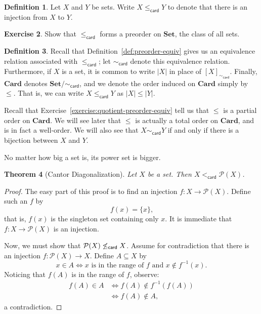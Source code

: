 \documentclass[letterpaper]{article}
\newtheorem{theorem}{Theorem}[section]
\theoremstyle{definition}
\newtheorem{definition}[theorem]{Definition}
\newtheorem{exercise}[theorem]{Exercise}
\renewcommand{\subset}{\subseteq}
\newcommand{\powerset}{\mathcal{P}}
\newcommand{\inverse}[1]{{#1^{-1}}}
\newcommand{\leqcard}{\mathrel{\leq_\mathsf{card}}}
\newcommand{\ltcard}{\mathrel{<_\mathsf{card}}}
\newcommand{\simcard}{\mathrel{\sim_\mathsf{card}}}
\newcommand{\setclass}{\mathbf{Set}}
\newcommand{\cardclass}{\mathbf{Card}}
\begin{document}
\begin{definition}
  Let \(X\) and \(Y\) be sets.  Write \(X \leqcard Y\) to denote that
  there is an injection from \(X\) to \(Y\).
\end{definition}

\begin{exercise}
  Show that \(\leqcard\) forms a preorder on \(\setclass\), the class
  of all sets.
\end{exercise}

\begin{definition}
  Recall that Definition~\ref{def:preorder-equiv} gives us an
  equivalence relation associated with \(\leqcard\); let \(\simcard\)
  denote this equivalence relation.  Furthermore, if \(X\) is a set,
  it is common to write \(|X|\) in place of \([X]_{\simcard}\).
  Finally, \(\cardclass\) denotes \(\setclass/{\simcard}\), and we
  denote the order induced on \(\cardclass\) simply by \(\leq\).  That
  is, we can write \(X \leqcard Y\) as \(|X| \leq |Y|\).
\end{definition}

Recall that Exercise~\ref{exercise:quotient-preorder-equiv} tell us
that \(\leq\) is a partial order on \(\cardclass\).  We will see later
that \(\leq\) is actually a total order on \(\cardclass\), and is in
fact a well-order.  We will also see that \(X \simcard Y\) if and only
if there is a bijection between \(X\) and \(Y\).

No matter how big a set is, its power set is bigger.
\begin{theorem}[Cantor Diagonalization]
  Let \(X\) be a set.  Then \(X \ltcard \powerset(X)\).
\end{theorem}
\begin{proof}
  The easy part of this proof is to find an injection \(f:X \to
  \powerset(X)\).  Define such an \(f\) by
  \[f(x) = \{x\}\text{,}\]
  that is, \(f(x)\) is the singleton set containing only \(x\).  It is
  immediate that \(f:X \to \powerset(X)\) is an injection.

  Now, we must show that \(\powerset(X) \not\leqcard X\).  Assume for
  contradiction that there is an injection \(f:\powerset(X) \to X\).
  Define \(A \subset X\) by
  \[x \in A \iff x \text{ is in the range of } f \text{ and } x \notin \inverse{f}(x) \text{.}\]
  Noticing that \(f(A)\) is in the range of \(f\), observe:
  \begin{align*}
    f(A) \in A
    &\iff f(A) \notin \inverse{f}(f(A)) \\
    &\iff f(A) \notin A \text{,}
  \end{align*}
  a contradiction.
\end{proof}
\end{document}
